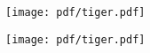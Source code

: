 \documentclass[a4paper]{article}
\makeatletter
\let\orig@includegraphics\includegraphics
\renewcommand\includegraphics[2][]{%
  \message{%
    ^^Jpdfpages file: #2
    ^^Jpdfpages options: #1
    ^^Jpdfpages status: \the\pdfpages@includegraphics@status\space
    ^^J}%
  \orig@includegraphics[#1]{#2}}
\makeatother
\begin{document}
\texttt{[image: pdf/tiger.pdf]}



\texttt{[image: pdf/tiger.pdf]}

\end{document}
